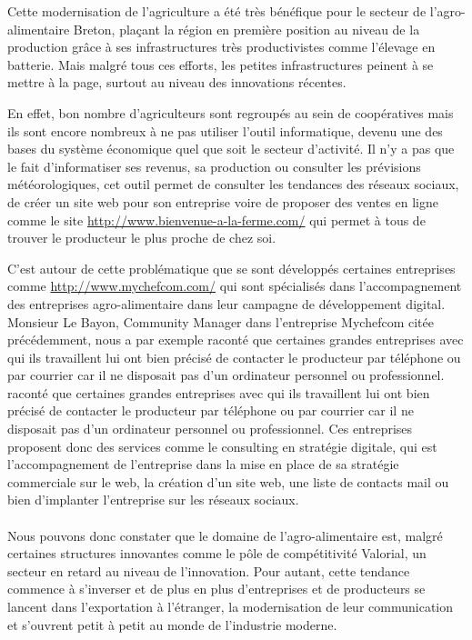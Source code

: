 \documentclass[a4paper,12pt]{report}
\begin{document}
			Cette modernisation de l’agriculture a été très bénéfique pour le secteur de l’agro-alimentaire Breton, plaçant la région en première position au niveau de la production grâce à ses infrastructures très productivistes comme l’élevage en batterie. Mais malgré tous ces efforts, les petites infrastructures peinent à se mettre à la page, surtout au niveau des innovations récentes. 
			
			En effet, bon nombre d’agriculteurs sont regroupés au sein de coopératives mais ils sont encore nombreux à ne pas utiliser l’outil informatique, devenu une des bases du système économique quel que soit le secteur d’activité\cite{FAIPeuInteresses,AdoptionTICAgricole}. Il n’y a pas que le fait d’informatiser ses revenus, sa production ou consulter les prévisions météorologiques, cet outil permet de consulter les tendances des réseaux sociaux, de créer un site web pour son entreprise voire de proposer des ventes en ligne comme le site \url{http://www.bienvenue-a-la-ferme.com/} qui permet à tous de trouver le producteur le plus proche de chez soi.
			
			C’est autour de cette problématique que se sont développés certaines entreprises comme \url{http://www.mychefcom.com/} qui sont spécialisés dans l’accompagnement des entreprises agro-alimentaire dans leur campagne de développement digital. Monsieur Le Bayon, Community Manager dans l’entreprise Mychefcom citée précédemment, nous a par exemple raconté que certaines grandes entreprises avec qui ils travaillent lui ont bien précisé de contacter le producteur par téléphone ou par courrier car il ne disposait pas d’un ordinateur personnel ou professionnel. raconté que certaines grandes entreprises avec qui ils travaillent lui ont bien précisé de contacter le producteur par téléphone ou par courrier car il ne disposait pas d’un ordinateur personnel ou professionnel. Ces entreprises proposent donc des services comme le consulting en stratégie digitale, qui est l’accompagnement de l’entreprise dans la mise en place de sa stratégie commerciale sur le web, la création d’un site web, une liste de contacts mail ou bien d’implanter l’entreprise sur les réseaux sociaux.
			
			\paragraph{}Nous pouvons donc constater que le domaine de l’agro-alimentaire est, malgré certaines structures innovantes comme le pôle de compétitivité Valorial, un secteur en retard au niveau de l’innovation. Pour autant, cette tendance commence à s’inverser et de plus en plus d’entreprises et de producteurs se lancent dans l’exportation à l’étranger, la modernisation de leur communication et s’ouvrent petit à petit au monde de l’industrie moderne.
			
\end{document}
